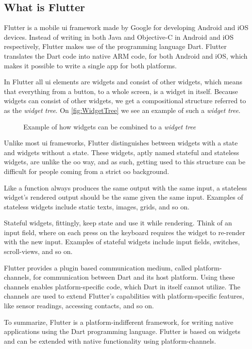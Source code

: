 \subsection{What is Flutter}

Flutter is a mobile \gls{ui} framework made by Google for developing Android and iOS devices\cite{flutterFAQ}. Instead of writing in both Java and Objective-C in Android and iOS respectively, Flutter makes use of the programming language Dart. Flutter translates the Dart code into native ARM code, for both Android and iOS, which makes it possible to write a single app for both platforms. 

In Flutter all \gls{ui} elements are widgets and consist of other widgets, which means that everything from a button, to a whole screen, is a widget in itself. Because widgets can consist of other widgets, we get a compositional structure referred to as the \textit{widget tree}. On \autoref{fig:WidgetTree} we see an example of such a \textit{widget tree}.

\begin{figure}[h]
    \centering
    \caption{Example of how widgets can be combined to a \textit{widget tree}}
    \label{fig:WidgetTree}
\end{figure}

Unlike most \gls{ui} frameworks, Flutter distinguishes between widgets with a state and widgets without a state. These widgets, aptly named stateful and stateless widgets, are unlike the \gls{oo} way, and as such, getting used to this structure can be difficult for people coming from a strict \gls{oo} background.

Like a function always produces the same output with the same input, a stateless widget's rendered output should be the same given the same input. Examples of stateless widgets include static texts, images, grids, and so on. 

Stateful widgets, fittingly, keep state and use it while rendering. Think of an input field, where on each press on the keyboard requires the widget to re-render with the new input. Examples of stateful widgets include input fields, switches, scroll-views, and so on.

Flutter provides a plugin based communication medium, called platform-channels, for communication between Dart and its host platform\cite{flutter_plugins}. Using these channels enables platform-specific code, which Dart in itself cannot utilize. The channels are used to extend Flutter's capabilities with platform-specific features, like sensor readings, accessing contacts, and so on.

To summarize, Flutter is a platform-indifferent framework, for writing native applications using the Dart programming language. Flutter is based on widgets and can be extended with native functionality using platform-channels.
